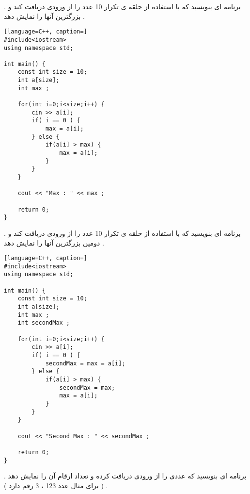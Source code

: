 \documentclass[12pt]{article}
\begin{document}
\newpage

 . برنامه ای بنویسید که با استفاده از حلقه ی تکرار 10 عدد را از ورودی دریافت کند و بزرگترین آنها را نمایش دهد .







\begin{latin}
\begin{lstlisting}[language=C++, caption=]
#include<iostream>
using namespace std;

int main() {
	const int size = 10;
	int a[size];
	int max ;
	
	for(int i=0;i<size;i++) {
		cin >> a[i];
		if( i == 0 ) {
			max = a[i];
		} else {
			if(a[i] > max) {
				max = a[i];
			}
		}
	}
	
	cout << "Max : " << max ;
	
	return 0;
}
\end{lstlisting}
\end{latin}






\newpage

 . برنامه ای بنویسید که با استفاده از حلقه ی تکرار 10 عدد را از ورودی دریافت کند و دومین بزرگترین آنها را نمایش دهد .




\begin{latin}
\begin{lstlisting}[language=C++, caption=]
#include<iostream>
using namespace std;

int main() {
	const int size = 10;
	int a[size];
	int max ;
	int secondMax ; 
	
	for(int i=0;i<size;i++) {
		cin >> a[i];
		if( i == 0 ) {
			secondMax = max = a[i];
		} else {
			if(a[i] > max) {
				secondMax = max;
				max = a[i];
			}
		}
	}
	
	cout << "Second Max : " << secondMax ;
	
	return 0;
}
\end{lstlisting}
\end{latin}







\newpage

 . برنامه ای بنویسید که عددی را از ورودی دریافت کرده و تعداد ارقام آن را نمایش دهد . ( برای مثال عدد 123 ، 3 رقم دارد )
\end{document}
